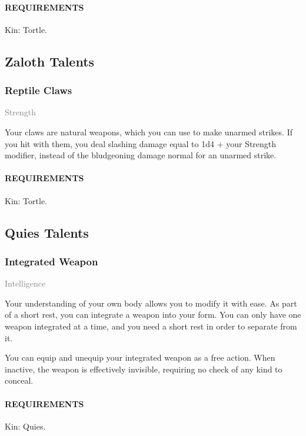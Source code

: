    \paragraph{REQUIREMENTS} Kin: Tortle.

\subsection*{Zaloth Talents}
    \subsubsection{Reptile Claws} \label{tal::reptileclaws}
    \small{\textcolor{gray}{Strength}}

    \normalsize
    Your claws are natural weapons, which you can use to make unarmed strikes.
    If you hit with them, you deal slashing damage equal to 1d4 + your Strength modifier, instead of the bludgeoning damage normal for an unarmed strike.
    \paragraph{REQUIREMENTS} Kin: Tortle.

\subsection*{Quies Talents}
    \subsubsection{Integrated Weapon} \label{tal::integratedweapon}
    \small{\textcolor{gray}{Intelligence}}

    \normalsize
    Your understanding of your own body allows you to modify it with ease.
    As part of a short rest, you can integrate a weapon into your form.
    You can only have one weapon integrated at a time, and you need a short rest in order to separate from it.

    You can equip and unequip your integrated weapon as a free action.
    When inactive, the weapon is effectively invisible, requiring no check of any kind to conceal.
    \paragraph{REQUIREMENTS} Kin: Quies.


